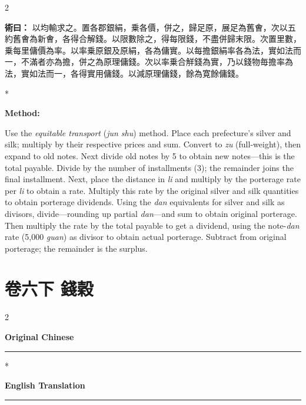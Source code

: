 \documentclass[11pt,a4paper]{article}
\newcommand{\CnMethod}[1]{\par\noindent\textbf{\color{methodcolor}術曰：}#1\par\vspace{0.5ex}}
\newcommand{\EnMethod}{\par\noindent\textbf{\color{methodcolor}Method:}\par\vspace{0.5ex}}
\newcommand{\switchEn}{\switchcolumn[1]*}
\begin{document}
\begin{paracol}{2}

\CnMethod{%
以均輸求之。置各郡銀絹，乗各價，併之，歸足原，展足為舊㑹，次以五約舊㑹為新㑹，各得合解錢。以限數除之，得每限錢，不盡併歸末限。次置里數，乗每里傭價為率。以率乗原銀及原絹，各為傭實。以每擔銀絹率各為法，實如法而一，不滿者亦為擔，併之為原理傭錢。次以率乗合觧錢為實，乃以錢物毎擔率為法，實如法而一，各得實用傭錢。以減原理傭錢，餘為寛餘傭錢。
}

\switchEn

\EnMethod
Use the \textit{equitable transport} (\textit{jun shu}) method. Place each prefecture's silver and silk; multiply by their respective prices and sum. Convert to \textit{zu} (full-weight), then expand to old notes. Next divide old notes by 5 to obtain new notes---this is the total payable. Divide by the number of installments (3); the remainder joins the final installment. Next, place the distance in \textit{li} and multiply by the porterage rate per \textit{li} to obtain a rate. Multiply this rate by the original silver and silk quantities to obtain porterage dividends. Using the \textit{dan} equivalents for silver and silk as divisors, divide---rounding up partial \textit{dan}---and sum to obtain original porterage. Then multiply the rate by the total payable to get a dividend, using the note-\textit{dan} rate (5,000 \textit{guan}) as divisor to obtain actual porterage. Subtract from original porterage; the remainder is the surplus.

\end{paracol}

\newpage

\section*{\color{titlecolor}卷六下 \quad 錢穀}

\begin{paracol}{2}
\begin{center}
\textbf{\large\color{sectioncolor} Original Chinese}\\[0.3em]
\textcolor{rulecolor}{\rule{0.3\columnwidth}{0.3pt}}
\end{center}
\switchEn
\begin{center}
\textbf{\large\color{sectioncolor} English Translation}\\[0.3em]
\textcolor{rulecolor}{\rule{0.3\columnwidth}{0.3pt}}
\end{center}
\end{paracol}
\end{document}
